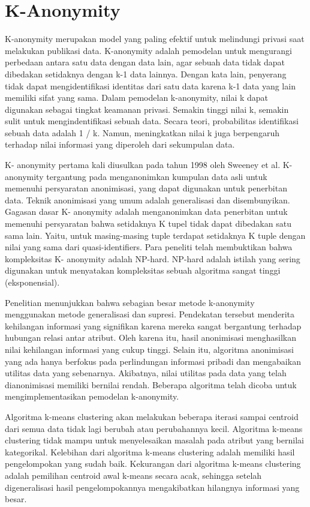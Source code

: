 \section{K-Anonymity}
K-anonymity merupakan model yang paling efektif untuk melindungi privasi saat melakukan publikasi data. K-anonymity adalah pemodelan untuk mengurangi perbedaan antara satu data dengan data lain, agar sebuah data tidak dapat dibedakan setidaknya dengan k-1 data lainnya. Dengan kata lain, penyerang tidak dapat mengidentifikasi identitas dari satu data karena k-1 data yang lain memiliki sifat yang sama. Dalam pemodelan k-anonymity, nilai k dapat digunakan sebagai tingkat keamanan privasi. Semakin tinggi nilai k, semakin sulit untuk mengindentifikasi sebuah data. Secara teori, probabilitas identifikasi sebuah data adalah 1 / k. Namun, meningkatkan nilai k juga berpengaruh terhadap nilai informasi yang diperoleh dari sekumpulan data.

\par K- anonymity pertama kali diusulkan pada tahun 1998 oleh Sweeney et al. K- anonymity tergantung pada menganonimkan kumpulan data asli untuk memenuhi persyaratan anonimisasi, yang dapat digunakan untuk penerbitan data. Teknik anonimisasi yang umum adalah generalisasi dan disembunyikan. Gagasan dasar K- anonymity adalah menganonimkan data penerbitan untuk memenuhi persyaratan bahwa setidaknya K tupel tidak dapat dibedakan satu sama lain. Yaitu, untuk masing-masing tuple terdapat setidaknya K tuple dengan nilai yang sama dari quasi-identifiers. Para peneliti telah membuktikan bahwa kompleksitas K- anonymity adalah NP-hard. NP-hard adalah istilah yang sering digunakan untuk menyatakan kompleksitas sebuah algoritma sangat tinggi (eksponensial).

\par Penelitian menunjukkan bahwa sebagian besar metode k-anonymity menggunakan metode generalisasi dan supresi. Pendekatan tersebut menderita kehilangan informasi yang signifikan karena mereka sangat bergantung terhadap hubungan relasi antar atribut. Oleh karena itu, hasil anonimisasi menghasilkan nilai kehilangan informasi yang cukup tinggi. Selain itu, algoritma anonimisasi yang ada hanya berfokus pada perlindungan informasi pribadi dan mengabaikan utilitas data yang sebenarnya. Akibatnya, nilai utilitas pada data yang telah dianonimisasi memiliki bernilai rendah. Beberapa algoritma telah dicoba untuk mengimplementasikan pemodelan k-anonymity.

\par Algoritma k-means clustering akan melakukan beberapa iterasi sampai centroid dari semua data tidak lagi berubah atau perubahannya kecil. Algoritma k-means clustering tidak mampu untuk menyelesaikan masalah pada atribut yang bernilai kategorikal. Kelebihan dari algoritma k-means clustering adalah memiliki hasil pengelompokan yang sudah baik. Kekurangan dari algoritma k-means clustering adalah pemilihan centroid awal k-means secara acak, sehingga setelah digeneralisasi hasil pengelompokannya mengakibatkan hilangnya informasi yang besar.

